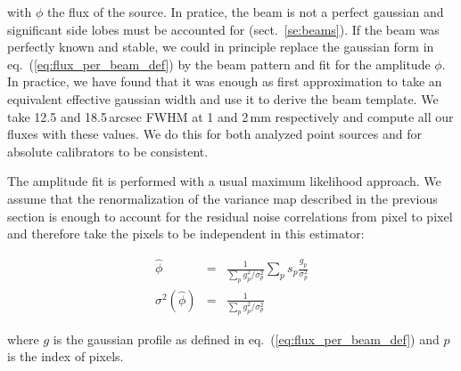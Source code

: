 with $\phi$ the flux of the source. In pratice, the beam is not a perfect
gaussian and significant side lobes must be accounted for
(sect.~\ref{se:beams}). If the beam was perfectly known and stable, we could in
principle replace the gaussian form in eq.~(\ref{eq:flux_per_beam_def}) by the
beam pattern and fit for the amplitude $\phi$. In practice, we have found that
it was enough as first approximation to take an equivalent effective gaussian
width and use it to derive the beam template. We take 12.5 and 18.5\,arcsec FWHM
at 1 and 2\,mm respectively and compute all our fluxes with these
values. We do this for both analyzed point sources and for absolute calibrators
to be consistent.

The amplitude fit is performed with a usual maximum likelihood
approach. We assume that the renormalization of the variance map described in
the previous section is enough to account for the residual noise correlations
from pixel to pixel and therefore take the pixels to be independent in this
estimator:

\begin{eqnarray}
\hat{\phi} &=& \frac{1}{\sum_p g_p^2/\sigma_p^2}\sum_p
s_p\frac{g_p}{\sigma_p^2} \label{eq:flux_estim_def} \\
\sigma^2(\hat{\phi}) &=& \frac{1}{\sum_p
  g_p^2/\sigma_p^2} \label{eq:flux_estim_var_def}
\end{eqnarray}

where $g$ is the gaussian profile as defined in eq.~(\ref{eq:flux_per_beam_def})
and $p$ is the index of pixels.



